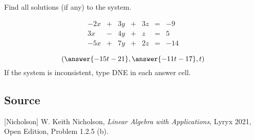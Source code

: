 \documentclass{ximera}
\author{}
\begin{document}
\begin{exercise}
Find all solutions (if any) to the system.  

$$\begin{matrix}
      -2x& +&3y&+&3z&=&-9\\
      3x & -&4y&+&z&= &5\\
      -5x&+&7y&+&2z&=&-14
    \end{matrix}$$

 $$(\answer{-15t-21}, \answer{-11t-17}, t)$$
If the system is inconsistent, type DNE in each answer cell.
\end{exercise}

\subsection*{Source}
[Nicholson] W. Keith Nicholson, {\it Linear Algebra with Applications}, Lyryx 2021, Open Edition, Problem 1.2.5 (b).
\end{document}
